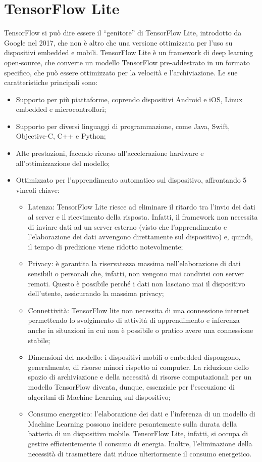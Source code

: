 \section{TensorFlow Lite}
TensorFlow si può dire essere il “genitore” di TensorFlow Lite\cite{tensorflow}, introdotto da Google nel 2017, che non è altro che una versione ottimizzata per l’uso su
dispositivi embedded e mobili. TensorFlow Lite è un framework di deep learning open-source, che converte un modello TensorFlow pre-addestrato in un formato
specifico, che può essere ottimizzato per la velocità e l’archiviazione. Le sue caratteristiche principali sono:
\begin{itemize}
    \item Supporto per più piattaforme, coprendo dispositivi Android e iOS, Linux embedded e microcontrollori;
    \item Supporto per diversi linguaggi di programmazione, come Java, Swift, Objective-C, C++ e Python;
    \item Alte prestazioni, facendo ricorso all’accelerazione hardware e all’ottimizzazione del modello;
    \item Ottimizzato per l’apprendimento automatico sul dispositivo, affrontando 5 vincoli chiave:
 \begin{itemize}
        \item Latenza: TensorFlow Lite riesce ad eliminare il ritardo tra l’invio dei dati al server e il ricevimento della risposta. Infatti, il
        framework non necessita di inviare dati ad un server esterno (visto che l’apprendimento e l’elaborazione dei dati avvengono direttamente sul
        dispositivo) e, quindi, il tempo di predizione viene ridotto notevolmente;
        \item Privacy: è garantita la riservatezza massima nell’elaborazione di dati sensibili o personali che, infatti, non vengono mai condivisi con
        server remoti. Questo è possibile perché i dati non lasciano mai il dispositivo dell’utente, assicurando la massima privacy;
        \item Connettività: TensorFlow lite non necessita di una connessione internet permettendo lo svolgimento di attività di apprendimento e inferenza
        anche in situazioni in cui non è possibile o pratico avere una connessione stabile;
        \item Dimensioni del modello: i dispositivi mobili o embedded dispongono, generalmente, di risorse minori rispetto ai computer. La riduzione dello
        spazio di archiviazione e della necessità di risorse computazionali per un modello TensorFlow diventa, dunque, essenziale per l’esecuzione di
        algoritmi di Machine Learning sul dispositivo;
        \item Consumo energetico: l’elaborazione dei dati e l’inferenza di un modello di Machine Learning possono incidere pesantemente sulla durata della
        batteria di un dispositivo mobile. TensorFlow Lite, infatti, si occupa di gestire efficientemente il consumo di energia. Inoltre, l’eliminazione
        della necessità di trasmettere dati riduce ulteriormente il consumo energetico.
    \end{itemize}
\end{itemize}






